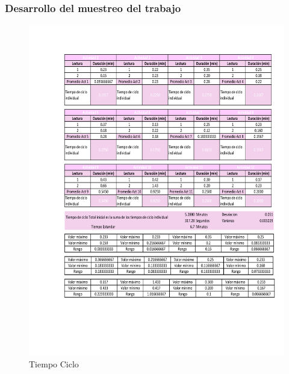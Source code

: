     \subsubsection{Desarrollo del muestreo del trabajo}
    \begin{figure}[H]
        \centering
        \includegraphics[scale=0.3]{9/Img/tiempoCiclo.pdf}
        \caption{Tiempo Ciclo}
        \label{fig:tiempo Ciclo}
    \end{figure}
